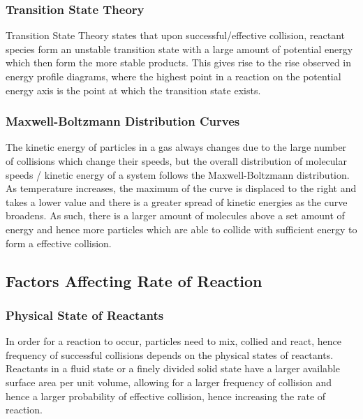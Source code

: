 \documentclass[../main]{subfiles}
\begin{document}
	\subsubsection{Transition State Theory}

	Transition State Theory states that upon successful/effective collision, reactant species form an unstable transition state with a large amount of potential energy which then form the more stable products. This gives rise to the rise observed in energy profile diagrams, where the highest point in a reaction on the potential energy axis is the point at which the transition state exists.

	\subsubsection{Maxwell-Boltzmann Distribution Curves}

	The kinetic energy of particles in a gas always changes due to the large number of collisions which change their speeds, but the overall distribution of molecular speeds / kinetic energy of a system follows the Maxwell-Boltzmann distribution. As temperature increases, the maximum of the curve is displaced to the right and takes a lower value and there is a greater spread of kinetic energies as the curve broadens. As such, there is a larger amount of molecules above a set amount of energy and hence more particles which are able to collide with sufficient energy to form a effective collision.

	\subsection{Factors Affecting Rate of Reaction}

	\subsubsection{Physical State of Reactants}

	In order for a reaction to occur, particles need to mix, collied and react, hence frequency of successful collisions depends on the physical states of reactants. \\

	Reactants in a fluid state or a finely divided solid state have a larger available surface area per unit volume, allowing for a larger frequency of collision and hence a larger probability of effective collision, hence increasing the rate of reaction. \\
\end{document}
